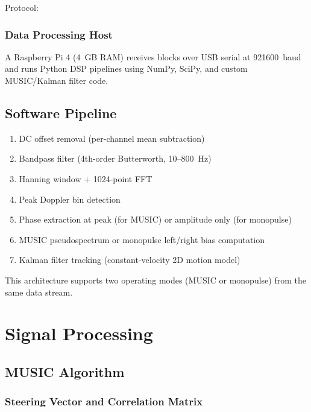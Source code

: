 \documentclass[10pt,a4paper]{article}
\begin{document}
Protocol:
\begin{equation}
[\text{0xDEADBEEF}] [\text{count}] [\text{1024} \times 4 \times \text{uint16}]
\end{equation}

\subsubsection{Data Processing Host}

A Raspberry Pi 4 (4~GB RAM) receives blocks over USB serial at 921600~baud and runs Python
DSP pipelines using NumPy, SciPy, and custom MUSIC/Kalman filter code.

\subsection{Software Pipeline}

\begin{enumerate}
\item DC offset removal (per-channel mean subtraction)
\item Bandpass filter (4th-order Butterworth, 10--800~Hz)
\item Hanning window + 1024-point FFT
\item Peak Doppler bin detection
\item Phase extraction at peak (for MUSIC) or amplitude only (for monopulse)
\item MUSIC pseudospectrum or monopulse left/right bias computation
\item Kalman filter tracking (constant-velocity 2D motion model)
\end{enumerate}

This architecture supports two operating modes (MUSIC or monopulse) from the same data stream.

\section{Signal Processing}
\label{sec:signal}

\subsection{MUSIC Algorithm}

\subsubsection{Steering Vector and Correlation Matrix}
\end{document}
